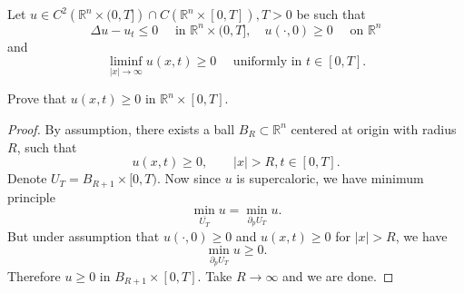 \begin{problem}
	Let $u \in C^2\left(\mathbb{R}^n \times(0, T]\right) \cap C\left(\mathbb{R}^n \times[0, T]\right), T>0$ be such that
\[
\Delta u-u_t \leq 0 \quad \text { in } \mathbb{R}^n \times(0, T], \quad u(\cdot, 0) \geq 0 \quad \text { on } \mathbb{R}^n
\]
and
\[
\liminf _{|x| \rightarrow \infty} u(x, t) \geq 0 \quad \text { uniformly in } t \in[0, T] .
\]

Prove that $u(x, t) \geq 0$ in $\mathbb{R}^n \times[0, T]$.
\end{problem}
\begin{proof}
	By assumption, there exists a ball $B_R \subset \mathbb{R}^n$ centered at origin with radius $R$, such that
	\[
		u(x, t) \ge 0, \qquad |x| > R, t \in [0,T]
	.\] 
	Denote $U_T = B_{R+1} \times [0,T)$.
	Now since  $u$ is supercaloric, we have minimum principle
	\[
		\min_{\overline{U_T} } u = \min_{\partial_p U_T} u
	.\] 
	But under assumption that $u(\cdot , 0) \ge 0$ and $u(x,t) \ge 0$ for $|x| > R$, we have
	\[
		\min_{\partial_p U_T} u \ge 0
	.\] 
	Therefore $u \ge 0$ in $B_{R+1} \times [0,T]$. Take $R\to \infty $ and we are done.
\end{proof}

